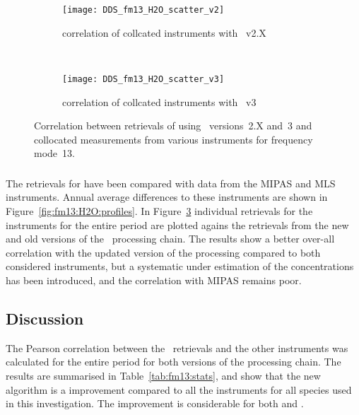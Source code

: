 \begin{figure}[htpb]
    \centering
    \begin{subfigure}[b]{0.49\textwidth}
        \texttt{[image: DDS\_fm13\_H2O\_scatter\_v2]}
        \caption{correlation of collcated instruments with \smr~v2.X}
        \label{fig:fm13:H2O:scatter:v2}
    \end{subfigure}
    \,
    \begin{subfigure}[b]{0.49\textwidth}
        \texttt{[image: DDS\_fm13\_H2O\_scatter\_v3]}
        \caption{correlation of collcated instruments with \smr~v3}
        \label{fig:fm13:H2O:scatter:v3}
    \end{subfigure}
    \caption{Correlation between retrievals of  using \smr\
    versions~2.X and~3 and collocated measurements from various instruments
    for frequency mode~13.}
    \label{fig:fm13:H2O:scatter}
\end{figure}

\subsubsection{}
\label{sec:fm13:comparison:H2O}
The retrievals for \chem{H_2O} have been compared with data from the MIPAS and
MLS instruments. Annual average differences to these instruments are shown in
Figure~\ref{fig:fm13:H2O:profiles}. In Figure~\ref{fig:fm13:H2O:scatter}
individual retrievals for the instruments for the entire period are plotted
agains the retrievals from the new and old versions of the \smr\ processing
chain. The results show a better over-all correlation with the updated version
of the processing compared to both considered instruments, but a systematic
under estimation of the concentrations has been introduced, and the correlation
with MIPAS remains poor.



\subsubsection{}
\label{sec:fm13:comparison:temperature}


\subsection{Discussion}
\label{sec:fm13:discussion}
The Pearson correlation between the \smr\ retrievals and the other instruments
was calculated for the entire period for both versions of the processing chain.
The results are summarised in Table~\ref{tab:fm13:stats}, and show that the
new algorithm is a improvement compared to all the instruments for all species
used in this investigation. The improvement is considerable for both \chem{O_3}
and \chem{H_2O}.


